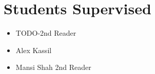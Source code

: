 \section{Students Supervised}

\vspace{6pt}

\begin{itemize}

  \setlength\itemsep{1em}

    \item{TODO-2nd Reader}
    
    \item{Alex Kassil}
    
    \item{Mansi Shah 2nd Reader}

\end{itemize}

\vspace{3pt}
